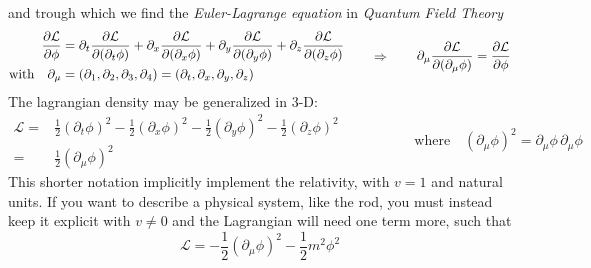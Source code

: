 \documentclass[class=article]{standalone}
\begin{document}
and trough which we find the \emph{Euler-Lagrange equation} in \emph{Quantum Field Theory}
\begin{equation*}
\begin{split}
\pdv{\mathcal{L}}{\phi} & = \partial_t \pdv{\mathcal{L}}{(\partial_t \phi)} + \partial_x \pdv{\mathcal{L}}{(\partial_x \phi)}  
+\partial_y \pdv{\mathcal{L}}{(\partial_y \phi)} +\partial_z \pdv{\mathcal{L}}{(\partial_z \phi)} \\
\mbox{with} \quad \partial_{\mu} & = (\partial_1, \partial_2, \partial_3, \partial_4) = (\partial_t, \partial_x, \partial_y, \partial_z)
\end{split}
\quad\quad\Rightarrow\quad\quad
\begin{split}
\partial_{\mu} \pdv{\mathcal{L}}{(\partial_{\mu} \phi)} = \pdv{\mathcal{L}}{\phi}
\end{split}
\end{equation*}
The lagrangian density may be generalized in 3-D:
\begin{equation*}
\begin{split}
\mathcal{L} = & \frac{1}{2} (\partial_t \phi)^2 - \frac{1}{2} (\partial_x \phi)^2 - \frac{1}{2} (\partial_y \phi)^2 - \frac{1}{2} (\partial_z \phi)^2 \\
= &  \frac{1}{2} (\partial_{\mu} \phi)^2
\end{split}
\quad\quad\quad\quad\quad \mbox{where} \quad (\partial_{\mu} \phi)^2  = \partial_{\mu} \phi \,\partial_{\mu} \phi
\end{equation*}
This shorter notation implicitly implement the relativity, with $v=1$ and natural units.
If you want to describe a physical system, like the rod, you must instead keep it explicit with $v \neq 0$ 
and the Lagrangian will need one term more, such that
\begin{equation*}
\mathcal{L} = - \frac{1}{2} (\partial_{\mu} \phi)^2 - \frac{1}{2} m^2 \phi^2
\end{equation*}
\end{document}
